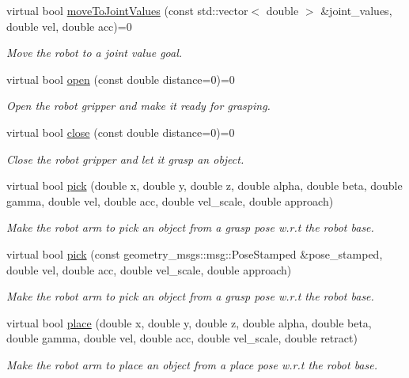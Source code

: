 \begin{DoxyCompactItemize}
virtual bool \hyperlink{classArmControlBase_aa78d160ed71fff8b9669536c953acf24}{move\+To\+Joint\+Values} (const std\+::vector$<$ double $>$ \&joint\+\_\+values, double vel, double acc)=0
\begin{DoxyCompactList}\small\item\em Move the robot to a joint value goal. \end{DoxyCompactList}\item 
virtual bool \hyperlink{classArmControlBase_aa2aeceddba7e0bfe1166199633dd3cba}{open} (const double distance=0)=0
\begin{DoxyCompactList}\small\item\em Open the robot gripper and make it ready for grasping. \end{DoxyCompactList}\item 
virtual bool \hyperlink{classArmControlBase_a7d767299ad4e2e087a89d911b93467c0}{close} (const double distance=0)=0
\begin{DoxyCompactList}\small\item\em Close the robot gripper and let it grasp an object. \end{DoxyCompactList}\item 
virtual bool \hyperlink{classArmControlBase_a447f53d50fb181492bf66a26e05c9aea}{pick} (double x, double y, double z, double alpha, double beta, double gamma, double vel, double acc, double vel\+\_\+scale, double approach)
\begin{DoxyCompactList}\small\item\em Make the robot arm to pick an object from a grasp pose w.\+r.\+t the robot base. \end{DoxyCompactList}\item 
virtual bool \hyperlink{classArmControlBase_aee6005df5aab9aa52d42b3adaf370856}{pick} (const geometry\+\_\+msgs\+::msg\+::\+Pose\+Stamped \&pose\+\_\+stamped, double vel, double acc, double vel\+\_\+scale, double approach)
\begin{DoxyCompactList}\small\item\em Make the robot arm to pick an object from a grasp pose w.\+r.\+t the robot base. \end{DoxyCompactList}\item 
virtual bool \hyperlink{classArmControlBase_a7bf0dfe8e090e9e334b6c3fcc47e8583}{place} (double x, double y, double z, double alpha, double beta, double gamma, double vel, double acc, double vel\+\_\+scale, double retract)
\begin{DoxyCompactList}\small\item\em Make the robot arm to place an object from a place pose w.\+r.\+t the robot base. \end{DoxyCompactList}\item 

\end{DoxyCompactItemize}
